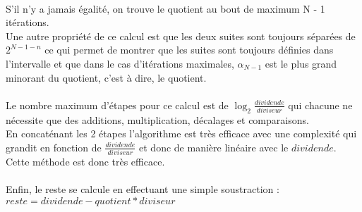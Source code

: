 \documentclass{article}
\begin{document}
\\
S'il n'y a jamais égalité, on trouve le quotient au bout de maximum N - 1 itérations.
\\
Une autre propriété de ce calcul est que les deux suites sont toujours séparées de $2^{N - 1 - n}$ ce qui permet de montrer que les suites sont toujours définies dans l'intervalle et que dans le cas
d'itérations maximales, $\alpha_{N - 1}$ est le plus grand minorant du quotient, c'est à dire, le quotient.
\\
\\
Le nombre maximum d'étapes pour ce calcul est de $\log_2{\frac{dividende}{diviseur}}$ qui chacune ne nécessite que des additions, multiplication, décalages et comparaisons.
\\
En concaténant les 2 étapes l'algorithme est très efficace avec une complexité qui grandit en fonction de $\frac{dividende}{diviseur}$ et donc de manière linéaire avec le $dividende$. Cette méthode est donc très efficace.
\\
\\
Enfin, le reste se calcule en effectuant une simple soustraction : $reste = dividende - quotient * diviseur$
\end{document}
